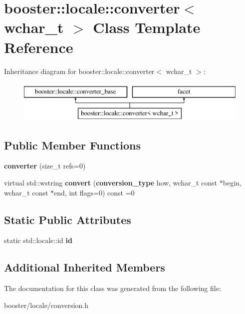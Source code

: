 \section{booster\+:\+:locale\+:\+:converter$<$ wchar\+\_\+t $>$ Class Template Reference}
\label{classbooster_1_1locale_1_1converter_3_01wchar__t_01_4}
Inheritance diagram for booster\+:\+:locale\+:\+:converter$<$ wchar\+\_\+t $>$\+:\begin{figure}[H]
\begin{center}
\leavevmode
\includegraphics[height=2.000000cm]{classbooster_1_1locale_1_1converter_3_01wchar__t_01_4}
\end{center}
\end{figure}
\subsection*{Public Member Functions}
\begin{DoxyCompactItemize}
\item 
{\bfseries converter} (size\+\_\+t refs=0)\label{classbooster_1_1locale_1_1converter_3_01wchar__t_01_4_aa7adfa8dc0dd7a8482d72748da609e6a}

\item 
virtual std\+::wstring {\bfseries convert} ({\bf conversion\+\_\+type} how, wchar\+\_\+t const $\ast$begin, wchar\+\_\+t const $\ast$end, int flags=0) const =0\label{classbooster_1_1locale_1_1converter_3_01wchar__t_01_4_a692b0eda1ce3dc7254ef7eb15b95bde3}

\end{DoxyCompactItemize}
\subsection*{Static Public Attributes}
\begin{DoxyCompactItemize}
\item 
static std\+::locale\+::id {\bfseries id}\label{classbooster_1_1locale_1_1converter_3_01wchar__t_01_4_a5f9ba76a1f6e2999f3477df7d9657bf0}

\end{DoxyCompactItemize}
\subsection*{Additional Inherited Members}


The documentation for this class was generated from the following file\+:\begin{DoxyCompactItemize}
\item 
booster/locale/conversion.\+h\end{DoxyCompactItemize}
